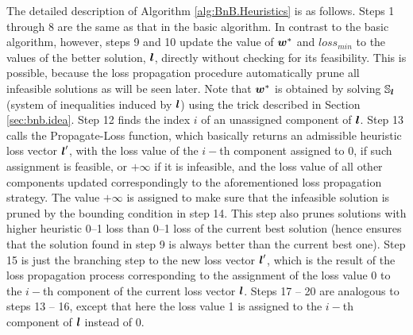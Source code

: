 The detailed description of Algorithm \ref{alg:BnB.Heuristics} is as follows. Steps 1 through 8 are the same as that in the basic algorithm. In contrast to the basic algorithm, however, steps 9 and 10 update the value of $\boldsymbol{w}^*$ and $loss_{min}$ to the values of the better solution, $\boldsymbol{l}$, directly without checking for its feasibility. This is possible, because the loss propagation procedure automatically prune all infeasible solutions as will be seen later. Note that $\boldsymbol{w}^*$ is obtained by solving $\mathbb{S}_{\boldsymbol{l}}$ (system of inequalities induced by $\boldsymbol{l}$) using the trick described in Section \ref{sec:bnb.idea}. Step 12 finds the index $i$ of an unassigned component of $\boldsymbol{l}$. Step 13 calls the {\sc Propagate-Loss} function, which basically returns an admissible heuristic loss vector $\boldsymbol{l}'$, with the loss value of the $i-$th component assigned to 0, if such assignment is feasible, or $+\infty$ if it is infeasible, and the loss value of all other components updated correspondingly to the aforementioned loss propagation strategy. The value $+\infty$ is assigned to make sure that the infeasible solution is pruned by the bounding condition in step 14. This step also prunes solutions with higher heuristic 0--1 loss than 0--1 loss of the current best solution (hence ensures that the solution found in step 9 is always better than the current best one). Step 15 is just the branching step to the new loss vector $\boldsymbol{l}'$, which is the result of the loss propagation process corresponding to the assignment of the loss value 0 to the $i-$th component of the current loss vector $\boldsymbol{l}$. Steps 17 -- 20 are analogous to steps 13 -- 16, except that here the loss value 1 is assigned to the $i-$th component of $\boldsymbol{l}$ instead of 0. 

